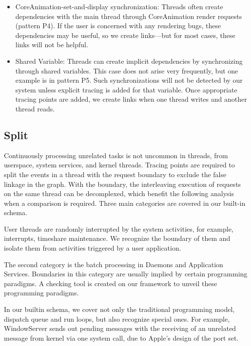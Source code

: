 \begin{itemize}
        \item CoreAnimation-set-and-display synchronization: Threads often
        create dependencies with the main thread through CoreAnimation render
        requests (pattern P4). If the user is concerned with any rendering
        bugs, these dependencies may be useful, so we create links---but for
        most cases, these links will not be helpful.

        \item Shared Variable: Threads can create implicit dependencies by
        synchronizing through shared variables. This case does not arise very
        frequently, but one example is in pattern P5. Such synchronizations
        will not be detected by our system unless explicit tracing is added for
        that variable. Once appropriate tracing points are added, we create
        links when one thread writes and another thread reads.

\end{itemize}

\subsection{Split}                                                                                                       
Continuously processing unrelated tasks is not uncommon in threads, from userspace, system services, and kernel threads.
Tracing points are required to split the events in a thread with the request boundary to exclude the false linkage in the graph.
With the boundary, the interleaving execution of requests on the same thread can be decomplexed, which benefit the following analysis when a comparison is required.
Three main categories are covered in our built-in schema.
    
User threads are randomly interrupted by the system activities, for example,
interrupts, timeshare maintenance. We recognize the boundary of them and
isolate them from activities triggered by a user application.

The second category is the batch processing in Daemons and Application
Services. Boundaries in this category are usually implied by certain
programming paradigms. A checking tool is created on our framework to unveil
these programming paradigms.

In our builtin schema, we cover not only the traditional programming model,
dispatch queue and run loops, but also recognize special ones. For example,
WindowServer sends out pending messages with the receiving of an unrelated
message from kernel via one system call, due to Apple's design of the port set.


